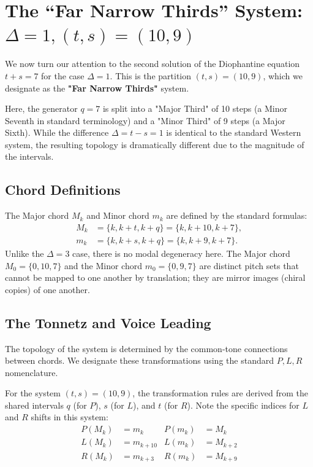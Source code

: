 \documentclass[12pt,letterpaper]{amsart}
\begin{document}
\section{The ``Far Narrow Thirds'' System: \texorpdfstring{$\Delta=1, (t,s)=(10,9)$}{Delta=1, (t,s)=(10,9)}}
\label{sec:far_thirds}

We now turn our attention to the second solution of the Diophantine equation $t+s=7$ for the case $\Delta=1$. This is the partition $(t,s)=(10,9)$, which we designate as the \textbf{"Far Narrow Thirds"} system.

Here, the generator $q=7$ is split into a "Major Third" of 10 steps (a Minor Seventh in standard terminology) and a "Minor Third" of 9 steps (a Major Sixth). While the difference $\Delta = t-s = 1$ is identical to the standard Western system, the resulting topology is dramatically different due to the magnitude of the intervals.

\subsection{Chord Definitions}
The Major chord $M_k$ and Minor chord $m_k$ are defined by the standard formulas:
\begin{align}
    M_k &= \{k, k+t, k+q\} = \{k, k+10, k+7\}, \\
    m_k &= \{k, k+s, k+q\} = \{k, k+9, k+7\}.
\end{align}
Unlike the $\Delta=3$ case, there is no modal degeneracy here. The Major chord $M_0 = \{0, 10, 7\}$ and the Minor chord $m_0 = \{0, 9, 7\}$ are distinct pitch sets that cannot be mapped to one another by translation; they are mirror images (chiral copies) of one another.

\subsection{The Tonnetz and Voice Leading}
The topology of the system is determined by the common-tone connections between chords. We designate these transformations using the standard $P, L, R$ nomenclature. 

For the system $(t,s)=(10,9)$, the transformation rules are derived from the shared intervals $q$ (for $P$), $s$ (for $L$), and $t$ (for $R$). Note the specific indices for $L$ and $R$ shifts in this system:
\begin{align*}
    P(M_k) &= m_k & P(m_k) &= M_k \\
    L(M_k) &= m_{k+10} & L(m_k) &= M_{k+2} \\
    R(M_k) &= m_{k+3} & R(m_k) &= M_{k+9}
\end{align*}
\end{document}
